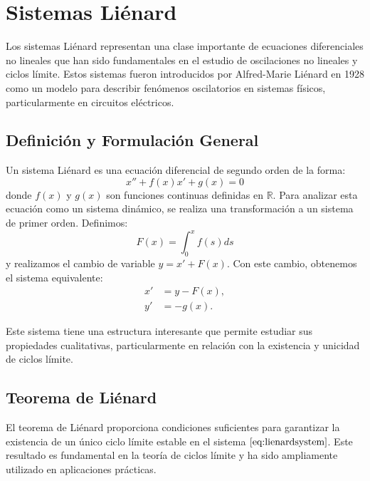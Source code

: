 \chapter{Sistemas Liénard}

Los sistemas Liénard representan una clase importante de ecuaciones diferenciales no lineales que han sido fundamentales en el estudio de oscilaciones no lineales y ciclos límite. Estos sistemas fueron introducidos por Alfred-Marie Liénard en 1928 como un modelo para describir fenómenos oscilatorios en sistemas físicos, particularmente en circuitos eléctricos.

\section{Definición y Formulación General}

Un sistema Liénard es una ecuación diferencial de segundo orden de la forma:
\begin{equation}\label{eq:lienard}
	x'' + f(x)x' + g(x) = 0
\end{equation}
donde $f(x)$ y $g(x)$ son funciones continuas definidas en $\mathbb{R}$. Para analizar esta ecuación como un sistema dinámico, se realiza una transformación a un sistema de primer orden. Definimos:
\[
F(x) = \int_0^x f(s)  ds
\]
y realizamos el cambio de variable $y = x' + F(x)$. Con este cambio, obtenemos el sistema equivalente:
\begin{equation}\label{eq:lienardsystem}
	\begin{aligned}
		x' &= y - F(x), \\
		y' &= -g(x).
	\end{aligned}
\end{equation}

Este sistema tiene una estructura interesante que permite estudiar sus propiedades cualitativas, particularmente en relación con la existencia y unicidad de ciclos límite.

\section{Teorema de Liénard}

El teorema de Liénard proporciona condiciones suficientes para garantizar la existencia de un único ciclo límite estable en el sistema $\eqref{eq:lienardsystem}$. Este resultado es fundamental en la teoría de ciclos límite y ha sido ampliamente utilizado en aplicaciones prácticas.

